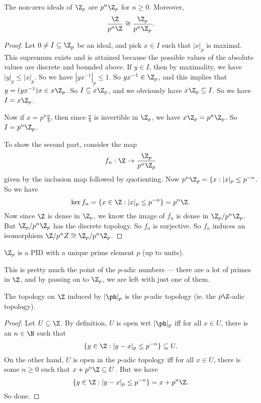 \documentclass[a4paper]{article}
\begin{document}
\begin{prop}
  The non-zero ideals of $\Z_p$ are $p^n \Z_p$ for $n \geq 0$. Moreover,
  \[
    \frac{\Z}{p^n \Z} \cong \frac{\Z_p}{p^n \Z_p}.
  \]
\end{prop}

\begin{proof}
  Let $0 \not= I \subseteq \Z_p$ be an ideal, and pick $x \in I$ such that $|x|_p$ is maximal. This supremum exists and is attained because the possible values of the absolute values are discrete and bounded above. If $y \in I$, then by maximality, we have $|y|_p \leq |x|_p$. So we have $|yx^{-1}|_p \leq 1$. So $yx^{-1} \in \Z_p$, and this implies that $y = (yx^{-1})x \in x\Z_p$. So $I \subseteq x\Z_p$, and we obviously have $x\Z_p \subseteq I$. So we have $I = x\Z_p$.

  Now if $x = p^n \frac{a}{b}$, then since $\frac{a}{b}$ is invertible in $\Z_p$, we have $x\Z_p = p^n \Z_p$. So $I = p^n \Z_p$.

  To show the second part, consider the map
  \[
    f_n: \Z \to \frac{\Z_p}{p^n \Z_p}
  \]
  given by the inclusion map followed by quotienting. Now $p^n \Z_p = \{x : |x|_p \leq p^{-n}$. So we have
  \[
    \ker f_n = \{x \in \Z: |x|_p \leq p^{-n}\} = p^n \Z.
  \]
  Now since $\Z$ is dense in $\Z_p$, we know the image of $f_n$ is dense in $\Z_p/p^n \Z_p$. But $\Z_p/p^n \Z_p$ has the discrete topology. So $f_n$ is surjective. So $f_n$ induces an isomorphism $\Z/p^n Z \cong \Z_p/p^n \Z_p$.
\end{proof}

\begin{cor}
  $\Z_p$ is a PID with a unique prime element $p$ (up to units).
\end{cor}
This is pretty much the point of the $p$-adic numbers --- there are a lot of primes in $\Z$, and by passing on to $\Z_p$, we are left with just one of them.

\begin{prop}
  The topology on $\Z$ induced by $|\ph|_p$ is the $p$-adic topology (ie. the $p\Z$-adic topology).
\end{prop}

\begin{proof}
  Let $U \subseteq \Z$. By definition, $U$ is open wrt $|\ph|_p$ iff for all $x \in U$, there is an $n\in \N$ such that
  \[
    \{y \in \Z: |y - x|_p \leq p^{-n}\} \subseteq U.
  \]
  On the other hand, $U$ is open in the $p$-adic topology iff for all $x \in U$, there is some $n \geq 0$ such that $x + p^n \Z \subseteq U$. But we have
  \[
    \{y \in \Z: |y - x|_p \leq p^{-n}\} = x + p^n \Z.
  \]
  So done.
\end{proof}
\end{document}
